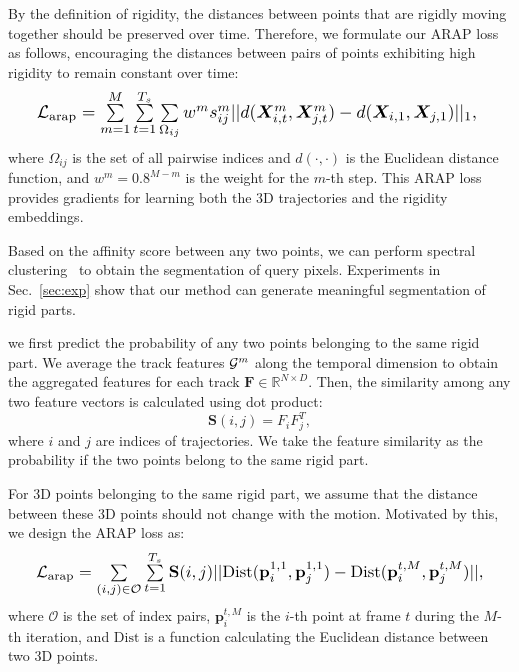 By the definition of rigidity, the distances between points that are rigidly moving together should be preserved over time. Therefore, we formulate our ARAP loss as follows, encouraging the distances between pairs of points exhibiting high rigidity to remain constant over time:
\begin{equation}
\resizebox{0.95\hsize}{!}{
    $\mathcal{L}_{\text{arap}} = \sum\limits_{m=1}^M
    \sum\limits_{t=1}^{T_s}
    \sum\limits_{\Omega_{ij}} w^m
    \smij ||d(\xitm, \xjtm) - d(\xqi, \xqj)||_1$,
\label{eq:arap}

}
\end{equation}
where $\Omega_{ij}$ is the set of all pairwise indices and $d(\cdot, \cdot)$ is the Euclidean distance function, and $w^m = 0.8^{M-m}$ is the weight for the $m$-th step. This ARAP loss provides gradients for learning both the 3D trajectories and the rigidity embeddings.

Based on the affinity score between any two points, we can perform spectral clustering~\cite{von2007tutorial,scikit-learn} to obtain the segmentation of query pixels.
Experiments in Sec.~\ref{sec:exp} show that our method can generate meaningful segmentation of rigid parts.

\iffalse
we first predict the probability of any two points belonging to the same rigid part.
We average the track features $\mathcal{G}^{m}$ along the temporal dimension to obtain the aggregated features for each track $\mathbf{F} \in \mathbb{R}^{N \times D}$.
Then, the similarity among any two feature vectors is calculated using dot product:
\begin{equation}
    \mathbf{S}(i, j) = F_i F_j^T,
\end{equation}
where $i$ and $j$ are indices of trajectories.
We take the feature similarity as the probability if the two points belong to the same rigid part.

For 3D points belonging to the same rigid part, we assume that the distance between these 3D points should not change with the motion.
Motivated by this, we design the ARAP loss as:
\begin{equation}

\resizebox{0.95\hsize}{!}{
    $\mathcal{L}_{\text{arap}} = \sum\limits_{(i, j) \in \mathcal{O}} \sum\limits_{t=1}^{T_s} \mathbf{S}(i, j) ||\text{Dist}(\mathbf{p}_i^{1,1}, \mathbf{p}_j^{1,1}) - \text{Dist}(\mathbf{p}_i^{t,M}, \mathbf{p}_j^{t,M})||$,
}
\end{equation}
where $\mathcal{O}$ is the set of index pairs, $\mathbf{p}_i^{t,M}$ is the $i$-th point at frame $t$ during the $M$-th iteration, and $\text{Dist}$ is a function calculating the Euclidean distance between two 3D points.

